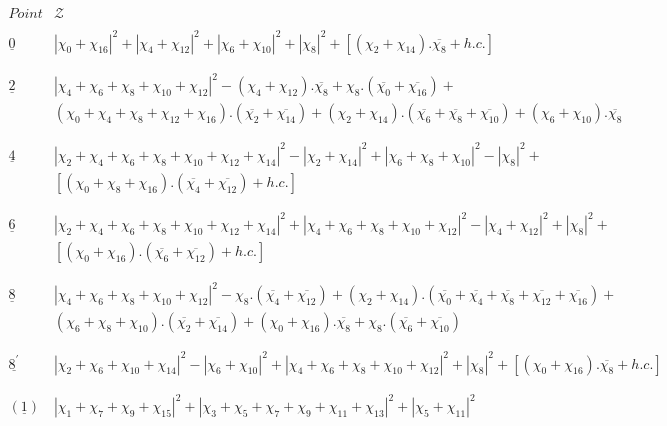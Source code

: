 \documentclass[a4paper,11pt]{article}
\newcommand{\ch}[1]{\chi_{#1}}
\newcommand{\och}[1]{\overline{\chi_{#1}}}
\newcommand{\ud}[1]{\underline{#1}}
\newcommand{\xa}[1]{|\chi_{#1}|^2}
\newcommand{\xaa}[2]{|\chi_{#1} + \chi_{#2}|^2}
\newcommand{\xaaa}[3]{|\chi_{#1} + \chi_{#2} + \chi_{#3}|^2}
\newcommand{\xaaaa}[4]{|\chi_{#1} + \chi_{#2}+ \chi_{#3}+ \chi_{#4}|^2}
\newcommand{\xaaaaa}[5]{|\chi_{#1} + \chi_{#2}+ \chi_{#3}+ \chi_{#4}+
\chi_{#5}|^2}
\newcommand{\xaaaaaa}[6]{|\chi_{#1} + \chi_{#2}+ \chi_{#3}+ \chi_{#4}+
                             \chi_{#5} + \chi_{#6}|^2}
\newcommand{\xaaaaaaa}[7]{|\chi_{#1} + \chi_{#2}+ \chi_{#3}+ \chi_{#4}+
                             \chi_{#5} + \chi_{#6}+ \chi_{#7}|^2}
\begin{document}
\begin{table}
\scriptsize
$$
\begin{array}{|c||l|}
\hline
Point & \mathcal{Z} \\
\hline
\hline
{}  &  {}  \\
\ud0 & \xaa{0}{16}+ \xaa{4}{12} + \xaa{6}{10} + \xa{8} + [(\ch{2} +
\ch{14}).\och{8} + h.c.] \\
{}  &  {}  \\
\hline
{}  &  {}  \\
\ud2  & \xaaaaa{4}{6}{8}{10}{12} - (\ch{4} + \ch{12}).\och{8} +
\ch{8}.(\och{0} + \och{16}) + \\
{} & (\ch{0} + \ch{4} + \ch{8} + \ch{12} + \ch{16}).(\och{2} +
\och{14}) + (\ch{2} + \ch{14}).(\och{6} + \och{8} + \och{10}) +
(\ch{6} + \ch{10}).\och{8} \\
{}  &  {}  \\
\hline
{}  &  {}  \\
\ud4  & \xaaaaaaa{2}{4}{6}{8}{10}{12}{14} - \xaa{2}{14} +
\xaaa{6}{8}{10} - \xa{8} + \\
{}  & [(\ch{0} + \ch{8} + \ch{16}).(\och{4} + \och{12}) + h.c.] \\
{}  &  {}  \\
\hline
{}  &  {}  \\
\ud6  & \xaaaaaaa{2}{4}{6}{8}{10}{12}{14} + \xaaaaa{4}{6}{8}{10}{12}
- \xaa{4}{12} + \xa{8} + \\
{}  & [(\ch{0} + \ch{16}).(\och{6} + \och{12}) + h.c.] \\
{}  &  {}  \\
\hline
{}  &  {}  \\
\ud8  & \xaaaaa{4}{6}{8}{10}{12} - \ch{8}.(\och{4} + \och{12}) +
(\ch{2} + \ch{14}).(\och{0} + \och{4} + \och{8} + \och{12} +
\och{16}) + \\
{}  & (\ch{6} + \ch{8} + \ch{10}).(\och{2} + \och{14}) + (\ch{0} +
\ch{16}).\och{8} + \ch{8}.(\och{6} + \och{10}) \\
{}  &  {}  \\
\hline
{}  &  {}  \\
\ud{8^{'}} & \xaaaa{2}{6}{10}{14} - \xaa{6}{10} +
\xaaaaa{4}{6}{8}{10}{12} + \xa{8} + [(\ch{0} + \ch{16}).\och{8}+
h.c.] \\
{}  &  {}  \\
\hline
\hline
{}  &  {}  \\
(\ud1)  &  \xaaaa{1}{7}{9}{15} + \xaaaaaa{3}{5}{7}{9}{11}{13} + \xaa{5}{11} \\
{}  &  {}  \\
\hline
{}  &  {}  \\

\end{array}$$
\end{table}
\end{document}
